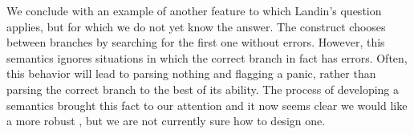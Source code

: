 We conclude with an example of another feature to which Landin's
question applies, but for which we do not yet know the answer. The \Punion{}
construct chooses between branches by searching for the first one
without errors. However, this semantics ignores situations in which
the correct branch in fact has errors. Often, this behavior will lead
to parsing nothing and flagging a panic, rather than parsing the
correct branch to the best of its ability.  The process of
developing a semantics brought this fact to our attention and
it now seems clear we would like a more robust
\Punion, but we are not currently sure how to design one. 








